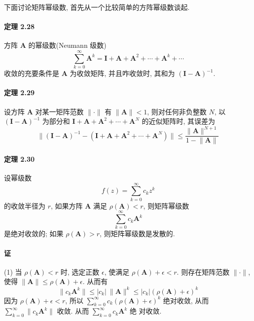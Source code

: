 \par 下面讨论矩阵幂级数, 首先从一个比较简单的方阵幂级数谈起.

\paragraph*{定理 2.28} 方阵 $\bm{A}$ 的幂级数(Neumann 级数)
$$
    \sum\limits_{k=0}^\infty \bm{A}^k = \bm{I} + \bm{A} + \bm{A}^2 + \cdots + \bm{A}^k + \cdots
$$
收敛的充要条件是 $\bm{A}$ 为收敛矩阵, 并且咋收敛时, 其和为 $(\bm{I} - \bm{A})^{-1}$.

\paragraph*{定理 2.29} 设方阵 $\bm{A}$ 对某一矩阵范数 $\lVert \bm{\cdot} \rVert$ 有 $\lVert \bm{A} \rVert < 1$, 则对任何非负整数 $N$, 以 $(\bm{I} - \bm{A})^{-1}$
为部分和 $\bm{I} + \bm{A} + \bm{A}^2 + \cdots + \bm{A}^N$ 的近似矩阵时, 其误差为
$$
    \lVert (\bm{I} - \bm{A})^{-1} - (\bm{I} + \bm{A} + \bm{A}^2 + \cdots + \bm{A}^N) \rVert \leqslant \dfrac{\lVert \bm{A} \rVert ^{N + 1}}{1 - \lVert \bm{A} \rVert}
$$

\paragraph*{定理 2.30} 设幂级数
$$
    f(z) = \sum\limits_{k = 0}^\infty c_k z^k
$$
的收敛半径为 $r$, 如果方阵 $\bm{A}$ 满足 $\rho(\bm{A}) < r$, 则矩阵幂级数
$$
    \sum\limits_{k = 0}^\infty c_k \bm{A}^k
$$
是绝对收敛的; 如果 $\rho(\bm{A}) > r$, 则矩阵幂级数是发散的.

\paragraph*{证} (1) 当 $\rho(\bm{A}) < r$ 时, 选定正数 $\epsilon$, 使满足 $\rho(\bm{A}) + \epsilon < r$. 则存在矩阵范数 $\lVert \bm{\cdot} \rVert$, 使得
$\lVert \bm{A} \rVert \leqslant \rho(\bm{A}) + \epsilon$. 从而有
$$
    \lVert c_k \bm{A}^k \rVert \leqslant \lvert c_k \rvert \ \lVert \bm{A} \rVert ^k \leqslant \lvert c_k \rvert (\rho(\bm{A}) + \epsilon)^k
$$
因为 $\rho(\bm{A}) + \epsilon < r$, 所以 $\sum\limits_{k=0}^\infty c_k(\rho(\bm{A}) + \epsilon)^k$ 绝对收敛, 从而 $\sum\limits_{k=0}^\infty \lVert c_k\bm{A}^k \rVert$ 收敛. 从而 $\sum\limits_{k = 0}^\infty c_k \bm{A}^k$ 绝
对收敛.

